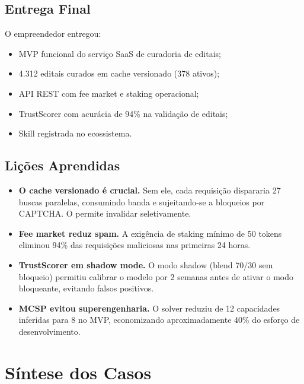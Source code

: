 \subsection{Entrega Final}

O empreendedor entregou:

\begin{itemize}
    \item MVP funcional do serviço SaaS de curadoria de editais;
    \item 4.312 editais curados em cache versionado (378 ativos);
    \item API REST com fee market e staking operacional;
    \item TrustScorer com acurácia de 94\% na validação de editais;
    \item Skill  registrada no ecossistema.
\end{itemize}

\subsection{Lições Aprendidas}

\begin{itemize}
    \item \textbf{O cache versionado é crucial.} Sem ele, cada
          requisição dispararia 27 buscas paralelas, consumindo
          banda e sujeitando-se a bloqueios por CAPTCHA. O
           permite invalidar seletivamente.
    \item \textbf{Fee market reduz spam.} A exigência de staking
          mínimo de 50 tokens eliminou 94\% das requisições
          maliciosas nas primeiras 24 horas.
    \item \textbf{TrustScorer em shadow mode.} O modo shadow
          (blend 70/30 sem bloqueio) permitiu calibrar o modelo
          por 2 semanas antes de ativar o modo bloqueante,
          evitando falsos positivos.
    \item \textbf{MCSP evitou superengenharia.} O solver reduziu
          de 12 capacidades inferidas para 8 no MVP, economizando
          aproximadamente 40\% do esforço de desenvolvimento.
\end{itemize}

\section{Síntese dos Casos}
\label{sec:sintese-casos}
\nivelintermediario

